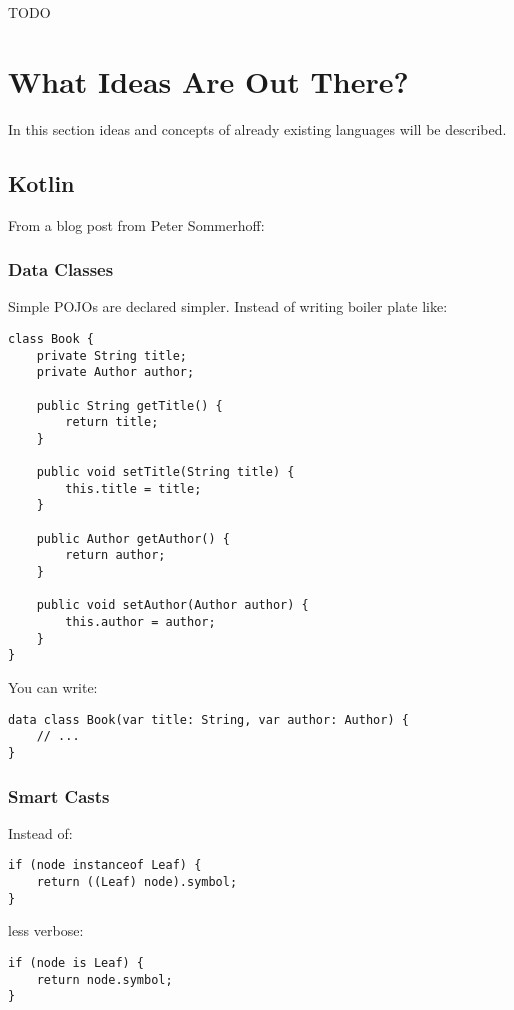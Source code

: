 \documentclass[a4paper,12pt]{article}
\begin{document}
TODO

\section{What Ideas Are Out There?}

In this section ideas and concepts of already existing languages will be described.

\subsection{Kotlin}

From a blog post from Peter Sommerhoff\cite{kotlin-sommerhoff}:

\subsubsection{Data Classes}

Simple POJOs are declared simpler. Instead of writing boiler plate like:

\begin{verbatim}
class Book {
    private String title;
    private Author author;

    public String getTitle() {
        return title;
    }
    
    public void setTitle(String title) {
        this.title = title;
    }

    public Author getAuthor() {
        return author;
    }
    
    public void setAuthor(Author author) {
        this.author = author;
    }
}
\end{verbatim}

You can write:

\begin{verbatim}
data class Book(var title: String, var author: Author) {
    // ...
}	
\end{verbatim}

\subsubsection{Smart Casts}

Instead of:

\begin{verbatim}
if (node instanceof Leaf) {
    return ((Leaf) node).symbol;
}	
\end{verbatim}

less verbose:

\begin{verbatim}
if (node is Leaf) {
    return node.symbol;
}	
\end{verbatim}
\end{document}
